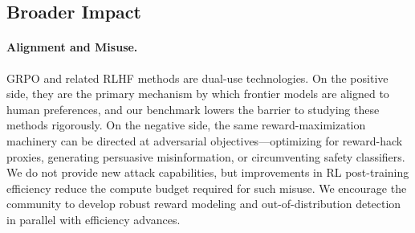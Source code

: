 \documentclass{article}
\begin{document}



























\subsection{Broader Impact}
\label{sec:impact}

\paragraph{Alignment and Misuse.}
GRPO and related RLHF methods are dual-use technologies. On the positive side,
they are the primary mechanism by which frontier models are aligned to human
preferences, and our benchmark lowers the barrier to studying these methods
rigorously. On the negative side, the same reward-maximization machinery can
be directed at adversarial objectives---optimizing for reward-hack proxies,
generating persuasive misinformation, or circumventing safety classifiers. We
do not provide new attack capabilities, but improvements in RL post-training
efficiency reduce the compute budget required for such misuse. We encourage
the community to develop robust reward modeling and out-of-distribution
detection in parallel with efficiency advances.
\end{document}
